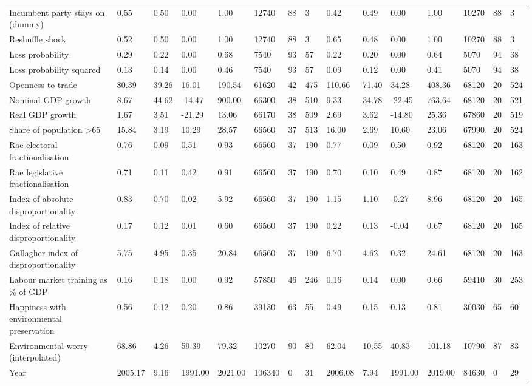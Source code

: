 \begin{longtable}{lllllllllllllll}
Incumbent party stays on (dummy) & 0.55 & 0.50 & 0.00 & 1.00 & 12740 & 88 & 3 & 0.42 & 0.49 & 0.00 & 1.00 & 10270 & 88 & 3\\
Reshuffle shock & 0.52 & 0.50 & 0.00 & 1.00 & 12740 & 88 & 3 & 0.65 & 0.48 & 0.00 & 1.00 & 10270 & 88 & 3\\
\addlinespace
Loss probability & 0.29 & 0.22 & 0.00 & 0.68 & 7540 & 93 & 57 & 0.22 & 0.20 & 0.00 & 0.64 & 5070 & 94 & 38\\
Loss probability squared & 0.13 & 0.14 & 0.00 & 0.46 & 7540 & 93 & 57 & 0.09 & 0.12 & 0.00 & 0.41 & 5070 & 94 & 38\\
Openness to trade & 80.39 & 39.26 & 16.01 & 190.54 & 61620 & 42 & 475 & 110.66 & 71.40 & 34.28 & 408.36 & 68120 & 20 & 524\\
Nominal GDP growth & 8.67 & 44.62 & -14.47 & 900.00 & 66300 & 38 & 510 & 9.33 & 34.78 & -22.45 & 763.64 & 68120 & 20 & 521\\
Real GDP growth & 1.67 & 3.51 & -21.29 & 13.06 & 66170 & 38 & 509 & 2.69 & 3.62 & -14.80 & 25.36 & 67860 & 20 & 519\\
\addlinespace
Share of population >65 & 15.84 & 3.19 & 10.29 & 28.57 & 66560 & 37 & 513 & 16.00 & 2.69 & 10.60 & 23.06 & 67990 & 20 & 524\\
Rae electoral fractionalisation & 0.76 & 0.09 & 0.51 & 0.93 & 66560 & 37 & 190 & 0.77 & 0.09 & 0.50 & 0.92 & 68120 & 20 & 163\\
Rae legislative fractionalisation & 0.71 & 0.11 & 0.42 & 0.91 & 66560 & 37 & 190 & 0.70 & 0.10 & 0.49 & 0.87 & 68120 & 20 & 162\\
Index of absolute disproportionality & 0.83 & 0.70 & 0.02 & 5.92 & 66560 & 37 & 190 & 1.15 & 1.10 & -0.27 & 8.96 & 68120 & 20 & 165\\
Index of relative disproportionality & 0.17 & 0.12 & 0.01 & 0.60 & 66560 & 37 & 190 & 0.22 & 0.13 & -0.04 & 0.67 & 68120 & 20 & 165\\
\addlinespace
Gallagher index of disproportionality & 5.75 & 4.95 & 0.35 & 20.84 & 66560 & 37 & 190 & 6.70 & 4.62 & 0.32 & 24.61 & 68120 & 20 & 163\\
Labour market training as \% of GDP & 0.16 & 0.18 & 0.00 & 0.92 & 57850 & 46 & 246 & 0.16 & 0.14 & 0.00 & 0.66 & 59410 & 30 & 253\\
Happiness with environmental preservation & 0.56 & 0.12 & 0.20 & 0.86 & 39130 & 63 & 55 & 0.49 & 0.15 & 0.13 & 0.81 & 30030 & 65 & 60\\
Environmental worry (interpolated) & 68.86 & 4.26 & 59.39 & 79.32 & 10270 & 90 & 80 & 62.04 & 10.55 & 40.83 & 101.18 & 10790 & 87 & 83\\
Year & 2005.17 & 9.16 & 1991.00 & 2021.00 & 106340 & 0 & 31 & 2006.08 & 7.94 & 1991.00 & 2019.00 & 84630 & 0 & 29\\
\bottomrule
\end{longtable}
